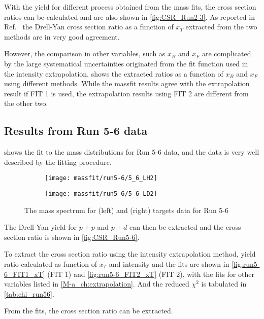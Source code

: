 \documentclass[../main.tex]{subfiles}
\begin{document}
With the yield for different process obtained from the mass fits, the cross section ratios can be calculated
and are also shown in \cref{fig:CSR_Run2-3}.
As reported in Ref.~\cite{dove2023} the Drell-Yan cross section ratio as a function of $x_T$ extracted from
the two methods are in very good agreement.

However, the comparison in other variables, such as $x_B$ and $x_F$ are complicated by the large
systematical uncertainties originated from the fit function used in the intensity extrapolation.
 shows the extracted ratios as a function of $x_B$ and $x_F$ using different methods.
While the massfit results agree with the extrapolation result if FIT 1 is used, the
extrapolation results using FIT 2 are different from the other two.

\FloatBarrier

\subsection{Results from Run 5-6 data}
 shows the fit to the mass distributions for Run 5-6 data,
and the data is very well described by the fitting procedure. 
\begin{figure}[h!]
	\begin{subfigure}{0.45\linewidth}
		\texttt{[image: massfit/run5-6/5\_6\_LH2]}
	\end{subfigure}
	\begin{subfigure}{0.45\linewidth}
		\texttt{[image: massfit/run5-6/5\_6\_LD2]}
	\end{subfigure}
	\caption{The mass spectrum for (left) and (right) targets data for Run 5-6}
	\label{fig:massfit_integrated_run56}
\end{figure}
The Drell-Yan yield for $p+p$ and $p+d$ can then be extracted and the cross section ratio
is shown in \cref{fig:CSR_Run5-6}.

To extract the cross section ratio using the intensity extrapolation method, yield ratio 
calculated as function of $x_T$ and intensity and the fits are shown in \cref{fig:run5-6_FIT1_xT}
(FIT 1) and \cref{fig:run5-6_FIT2_xT} (FIT 2), with the fits for other variables listed in
\cref{M-a_ch:extrapolation}. And the reduced $\chi^2$ is tabulated in \cref{tab:chi_run56}.


From the fits, the cross section ratio can be extracted.
\end{document}
